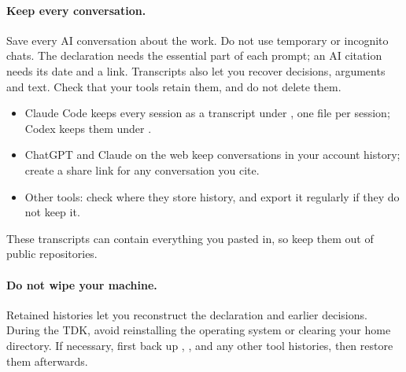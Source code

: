 \paragraph{Keep every conversation.} Save every AI conversation about the work. Do not use temporary or incognito chats. The declaration needs the essential part of each prompt; an AI citation needs its date and a link. Transcripts also let you recover decisions, arguments and text. Check that your tools retain them, and do not delete them.
\begin{itemize}[noitemsep]
  \item Claude Code keeps every session as a transcript under , one file per session; Codex keeps them under .
  \item ChatGPT and Claude on the web keep conversations in your account history; create a share link for any conversation you cite.
  \item Other tools: check where they store history, and export it regularly if they do not keep it.
\end{itemize}
These transcripts can contain everything you pasted in, so keep them out of public repositories.

\paragraph{Do not wipe your machine.} Retained histories let you reconstruct the declaration and earlier decisions. During the TDK, avoid reinstalling the operating system or clearing your home directory. If necessary, first back up , ,  and any other tool histories, then restore them afterwards.

